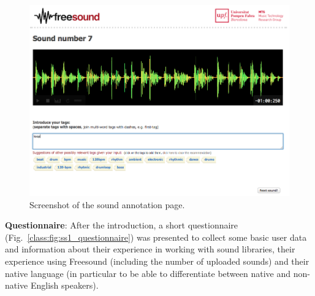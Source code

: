 \begin{description}
   \begin{figure}
  \centering
  \includegraphics[width=1.0\columnwidth]{ch04_class/pics/fig_ss2_sound.png}
  \caption[Screenshot of the sound annotation page]{Screenshot of the sound annotation page.}
  \label{class:fig:ss2_sound}
\end{figure}

  \item \textbf{Questionnaire}: After the introduction, a short questionnaire (Fig.~\ref{class:fig:ss1_questionnaire}) was presented to collect some basic user data and information about their experience in working with sound libraries, their experience using Freesound (including the number of uploaded sounds) and their native language (in particular to be able to differentiate between native and non-native English speakers).


\end{description}
